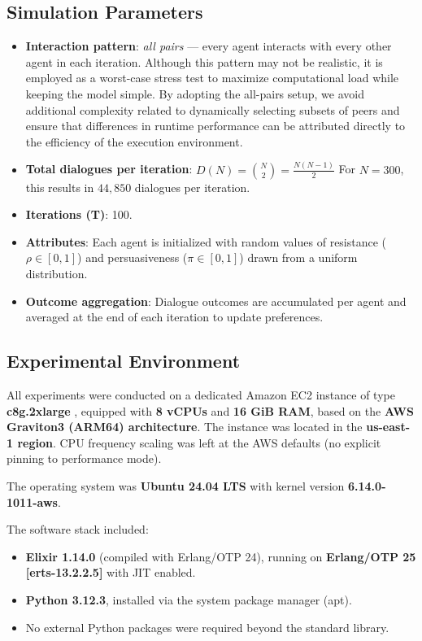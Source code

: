 \documentclass[
]{ceurart}
\begin{document}
\subsection{Simulation Parameters}
\begin{itemize}
	\item \textbf{Interaction pattern}: \emph{all pairs} — every agent interacts with every other agent in each iteration. Although this pattern may not be realistic, it is employed as a worst-case stress test to maximize computational load while keeping the model simple. By adopting the all-pairs setup, we avoid additional complexity related to dynamically selecting subsets of peers and ensure that differences in runtime performance can be attributed directly to the efficiency of the execution environment.

	\item \textbf{Total dialogues per iteration}:
$D(N) = \binom{N}{2} = \frac{N(N-1)}{2}$
For $N = 300$, this results in $44{,}850$ dialogues per iteration.
	\item \textbf{Iterations (T)}: 100.
	\item \textbf{Attributes}: Each agent is initialized with random values of resistance ($\rho \in [0,1]$) and persuasiveness ($\pi \in [0,1]$) drawn from a uniform distribution.
	\item \textbf{Outcome aggregation}: Dialogue outcomes are accumulated per agent and averaged at the end of each iteration to update preferences.
\end{itemize}


\subsection{Experimental Environment}
All experiments were conducted on a dedicated Amazon EC2 instance of type \textbf{c8g.2xlarge} \cite{AwsInstanceTypes2025}, equipped with \textbf{8 vCPUs} and \textbf{16 GiB RAM}, based on the \textbf{AWS Graviton3 (ARM64) architecture}. The instance was located in the \textbf{us-east-1 region}. CPU frequency scaling was left at the AWS defaults (no explicit pinning to performance mode).

The operating system was \textbf{Ubuntu 24.04 LTS} with kernel version \textbf{6.14.0-1011-aws}.

The software stack included:
\begin{itemize}
    \item \textbf{Elixir 1.14.0} (compiled with Erlang/OTP 24), running on \textbf{Erlang/OTP 25 [erts-13.2.2.5]} with JIT enabled.
    \item \textbf{Python 3.12.3}, installed via the system package manager (apt).
    \item No external Python packages were required beyond the standard library.
\end{itemize}
\end{document}
